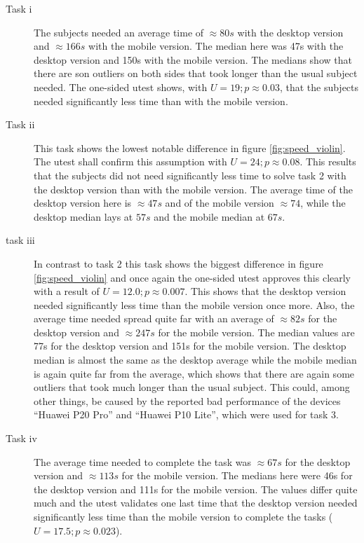 \begin{description}
  \item[Task i] The subjects needed an average time of $\approx 80s$ with the desktop version and $\approx 166s$ with the mobile version. 
  The median here was 47s with the desktop version and 150s with the mobile version. 
  The medians show that there are son outliers on both sides that took longer than the usual subject needed. 
  The one-sided \gls{utest} shows, with $U = 19; p \approx 0.03$, that the subjects needed significantly less time than with the mobile version.
  \item[Task ii] This task shows the lowest notable difference in figure \ref{fig:speed_violin}. 
  The \gls{utest} shall confirm this assumption with $U=24; p \approx 0.08$.
  This results that the subjects did not need significantly less time to solve task 2 with the desktop version than with the mobile version.
  The average time of the desktop version here is $\approx 47s$ and of the mobile version $\approx 74$, while the desktop median lays at $57s$ and the mobile median at $67s$.
  \item[task iii] In contrast to task 2 this task shows the biggest difference in figure \ref{fig:speed_violin} and once again the one-sided \gls{utest} approves this clearly with a result of $U=12.0;p \approx 0.007$. 
  This shows that the desktop version needed significantly less time than the mobile version once more. 
  Also, the average time needed spread quite far with an average of $\approx 82s$ for the desktop version and $\approx 247s$ for the mobile version.
  The median values are 77s for the desktop version and 151s for the mobile version.
  The desktop median is almost the same as the desktop average while the mobile median is again quite far from the average, which shows that there are again some outliers that took much longer than the usual subject. 
  This could, among other things, be caused by the reported bad performance of the devices \enquote{Huawei P20 Pro} and \enquote{Huawei P10 Lite}, which were used for task 3.
  \item[Task iv] The average time needed to complete the task was $\approx 67s$ for the desktop version and $\approx 113s$ for the mobile version. 
  The medians here were 46s for the desktop version and 111s for the mobile version. 
  The values differ quite much and the \gls{utest} validates one last time that the desktop version needed significantly less time than the mobile version to complete the tasks ($U=17.5;p \approx 0.023$).
\end{description}

